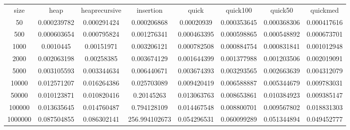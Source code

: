 \begin{table}
\begin{tabular}{cccccccc}
size & heap & heaprecursive & insertion & quick & quick100 & quick50 & quickmed \\
50 & 0.000239782 & 0.000291424 & 0.000206868 & 0.00020939 & 0.000353645 & 0.000368306 & 0.000417616 \\
500 & 0.000603654 & 0.000795824 & 0.001276341 & 0.000463395 & 0.000598865 & 0.000548892 & 0.000673701 \\
1000 & 0.0010445 & 0.00151971 & 0.003206121 & 0.000782508 & 0.000884754 & 0.000831841 & 0.001012948 \\
2000 & 0.002063198 & 0.00258385 & 0.003674129 & 0.001644399 & 0.001377988 & 0.001203506 & 0.002019091 \\
5000 & 0.003105593 & 0.003344634 & 0.006440671 & 0.003674393 & 0.003293565 & 0.002663639 & 0.004312079 \\
10000 & 0.012571207 & 0.016264386 & 0.025703089 & 0.009420419 & 0.006588887 & 0.005344679 & 0.009783031 \\
50000 & 0.010123871 & 0.010820416 & 0.20145263 & 0.013063763 & 0.008653861 & 0.010384923 & 0.009385147 \\
100000 & 0.013635645 & 0.014760487 & 0.794128109 & 0.014467548 & 0.008800701 & 0.009567802 & 0.018831303 \\
1000000 & 0.087504855 & 0.086302141 & 256.994102673 & 0.054296531 & 0.060099289 & 0.051344894 & 0.049452777 \\
\end{tabular}
\end{table}
